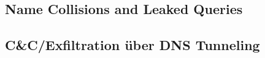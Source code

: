 \begin{comment}
* Unbemerkte übernehme von Domänen möglich
* Komplimitierung von Stakeholder-Diensten möglich
  * Bei Websites  (HTTP od. uralt Browser mit Mixed Active Content) führt die komprimitierung eines einzigen Ressourcenservers zum komprimitierung der gesamten Seite: XSS wird einfach möglich wenn z.B. eine JS-Datei eines Werbeanbieters in die Seite geladen werden kann.
  * Wenn eine einzige aktive Ressource über http nachgeladen wird oder für TLS Attacken (Poodle, ) anfällig ist, kann die seite und somit der client angegriffen werden.
* Bei nicht verschüsselten Netzwerkprotokollen (plain SMTP/POP3/IMAP, FTP, MQTT) kann die Verbindung vollständig übernommen werden.
* In jedem Fall sorgt eine erfolgreiche Attacke zum Übergang der Verfügbarkeitskontrolle an den Angreifer (bis zum Erkennen das Problems und entfernen der eingeschläuschten Einträge)
\end{comment}

\subsection{Name Collisions and Leaked Queries} 

\begin{comment}
* Durch eigene interne TLDs (z.B. .local) kann es zu Kollisionen im globalen Namespace kommen (new TLDs).
* Mögliche Kollisionen können bewusst ausgenutzt werden.
* Durch falsch/schlecht konfigurierte DNS-Resolver können interne Anfragen zu externen DNS-Servern getragen werden -> Information Disclousure
* Speziell bei "home-use" und ohne "LockDown" kann durch lokale Proxies und Resolver von "leakage" betroffen sein. Auch BYOD-Geräte speziell gefährdet wenn durch falsche Konfiguration DNS-Anfragen zum Auflösen internen Ressourcen an externe DNS-Server gestellt werden.
\end{comment}

\subsection{C&C/Exfiltration über DNS Tunneling}

\begin{comment}
* Mit allen "offenen" resolvern nutzbar
* Bei "best-practice"-Einstellungen des resolvers sehr langsam
* Nicht einfach zu erkennen
* Für sehr kleine Datenmengen durchaus zuverlässig (C&C)
* KillChain: Data Exfiltration, Controll
\end{comment}


